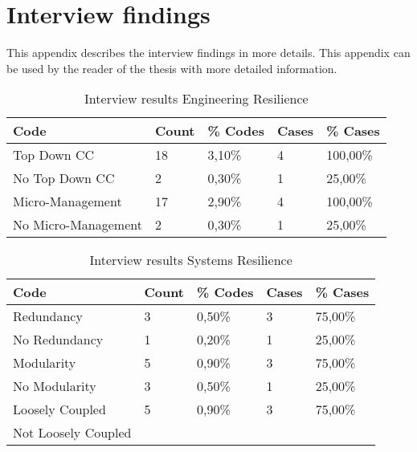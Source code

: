 \chapter{Interview findings}
\label{app:interviewfindings}
This appendix describes the interview findings in more details. This appendix can be used by the reader of the thesis with more detailed information.
\begin{table}[htbp]
	\centering
	\begin{tabular}{lllll}
		\toprule
		\textbf{Code} & \multicolumn{1}{l}{\textbf{Count}} & \multicolumn{1}{l}{\textbf{\% Codes}} & \multicolumn{1}{l}{\textbf{Cases}} & \multicolumn{1}{l}{\textbf{\% Cases}} \\
		\midrule
		Top Down CC &  18    & 3,10\% & 4     & 100,00\% \\
		No Top Down CC & 2     & 0,30\% & 1     & 25,00\% \\
		Micro-Management & 17    & 2,90\% & 4     & 100,00\% \\
		No Micro-Management & 2     & 0,30\% & 1     & 25,00\% \\
		\bottomrule
	\end{tabular}%
	\caption{Interview results Engineering Resilience}
	\label{tab:interviewresultsengineeringresilience}%
\end{table}%

\begin{table}[htbp]
	\centering
	\begin{tabular}{lllll}
		\toprule
		\textbf{Code} & \textbf{Count} & \textbf{\% Codes} &\textbf{Cases} & \textbf{\% Cases} \\
		\midrule
		Redundancy & 3     & 0,50\% & 3     & 75,00\% \\
		No Redundancy & 1     & 0,20\% & 1     & 25,00\% \\
		Modularity & 5     & 0,90\% & 3     & 75,00\% \\
		No Modularity & 3     & 0,50\% & 1     & 25,00\% \\
		Loosely Coupled & 5     & 0,90\% & 3     & 75,00\% \\
		Not Loosely Coupled &       &       &       &  \\
		\bottomrule
	\end{tabular}%
		\caption{Interview results Systems Resilience}%
	\label{tab:interviewresults Systems Resilience}%
\end{table}%

